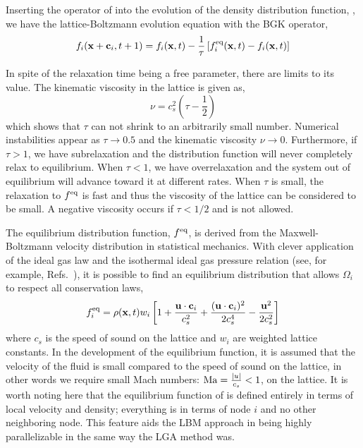 Inserting the operator of  into the evolution of the density distribution function, , we have the lattice-Boltzmann evolution equation with the BGK operator,
\begin{equation}\label{eq:lbm-bgk}
	f_i(\mathbf{x}+\mathbf{c}_i, t + 1) = f_i(\mathbf{x},t) - \frac{1}{\tau}\left[f_i^{\text{eq}}(\mathbf{x},t) - f_i(\mathbf{x},t)\right]
\end{equation}

In spite of the relaxation time being a free parameter, there are limits to its value. The kinematic viscosity in the lattice is given as,
\begin{equation}\label{eq:lbm-viscosity-relaxation-time}
	\nu = c_s^2\left(\tau-\frac{1}{2}\right)
\end{equation}
which shows that $\tau$ can not shrink to an arbitrarily small number. Numerical instabilities appear as $\tau \rightarrow 0.5$ and the kinematic viscosity $\nu \rightarrow 0$. Furthermore, if $\tau > 1$, we have subrelaxation and the distribution function will never completely relax to equilibrium. When $\tau < 1$, we have overrelaxation and the system out of equilibrium will advance toward it at different rates. When $\tau$ is small, the relaxation to $f^{\text{eq}}$ is fast and thus the viscosity of the lattice can be considered to be small. A negative viscosity occurs if $\tau < 1/2$ and is not allowed.\cite{Chopard2002,Chen1998a}

The equilibrium distribution function, $f^{\text{eq}}$, is derived from the Maxwell-Boltzmann velocity distribution in statistical mechanics. With clever application of the ideal gas law and the isothermal ideal gas pressure relation (see, for example, Refs.~\cite{Viggen2009,Chopard2002}), it is possible to find an equilibrium distribution that allows $\Omega_i$ to respect all conservation laws,
\begin{equation}\label{eq:equilib-dist-function}
	f_i^{\text{eq}} = \rho(\mathbf{x},t)w_i\left[1+\frac{\mathbf{u}\cdot\mathbf{c}_i}{c_s^2} + \frac{(\mathbf{u}\cdot\mathbf{c}_i)^2}{2c_s^4} - \frac{\mathbf{u}^2}{2c_s^2} \right]
\end{equation}
where $c_s$ is the speed of sound on the lattice and $w_i$ are weighted lattice constants. In the development of the equilibrium function, it is assumed that the velocity of the fluid is small compared to the speed of sound on the lattice, in other words we require small Mach numbers: $\mathrm{Ma} = \frac{|u|}{c_s} < 1$, on the lattice.\cite{qian1992lattice,Chen1998a} It is worth noting here that the equilibrium function of  is defined entirely in terms of local velocity and density; everything is in terms of node $i$ and no other neighboring node. This feature aids the LBM approach in being highly parallelizable in the same way the LGA method was.


